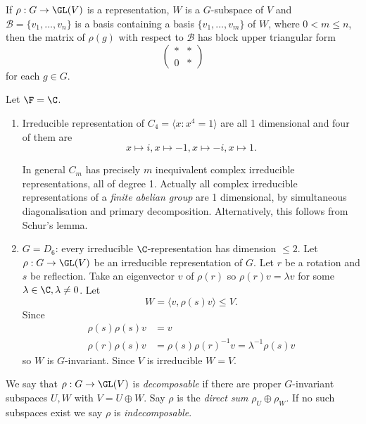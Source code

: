 \documentclass[a4paper]{article}
\theoremstyle{definition}
\begin{document}
\begin{lemma}
  If \(\rho: G \to \GL(V)\) is a representation, \(W\) is a \(G\)-subspace of \(V\) and \(\mathcal B = \{v_1, \dots, v_n\}\) is a basis containing a basis \(\{v_1, \dots, v_m\}\) of \(W\), where \(0 < m \leq n\), then the matrix of \(\rho(g)\) with respect to \(\mathcal B\) has block upper triangular form
  \[
    \begin{pmatrix}
      * & * \\
      0 & *
    \end{pmatrix}
  \]
  for each \(g \in G\).
\end{lemma}

\begin{eg}
  Let \(\F = \C\).
  \begin{enumerate}
  \item Irreducible representation of \(C_4 = \langle x: x^4 = 1\rangle\) are all 1 dimensional and four of them are
    \[
      x \mapsto i, x \mapsto -1, x \mapsto -i, x \mapsto 1.
    \]

    In general \(C_m\) has precisely \(m\) inequivalent complex irreducible representations, all of degree 1. Actually all complex irreducible representations of a \emph{finite abelian group} are 1 dimensional, by simultaneous diagonalisation and primary decomposition. Alternatively, this follows from Schur's lemma.
  \item \(G = D_6\): every irreducible \(\C\)-representation has dimension \(\leq 2\). Let \(\rho: G \to \GL(V)\) be an irreducible representation of \(G\). Let \(r\) be a rotation and \(s\) be reflection. Take an eigenvector \(v\) of \(\rho(r)\) so \(\rho(r)v = \lambda v\) for some \(\lambda \in \C, \lambda \neq 0\). Let
    \[
      W = \langle v, \rho(s) v \rangle \leq V.
    \]
    Since
    \begin{align*}
      \rho(s)\rho(s) v &= v \\
      \rho(r)\rho(s) v &= \rho(s)\rho(r)^{-1}v = \lambda^{-1}\rho(s)v
    \end{align*}
    so \(W\) is \(G\)-invariant. Since \(V\) is irreducible \(W = V\).
  \end{enumerate}
\end{eg}

\begin{definition}
  We say that \(\rho: G \to \GL(V)\) is \emph{decomposable} if there are proper \(G\)-invariant subspaces \(U, W\) with \(V = U \oplus W\). Say \(\rho\) is the \emph{direct sum} \(\rho_U \oplus \rho_W\). If no such subspaces exist we say \(\rho\) is \emph{indecomposable}.
\end{definition}
\end{document}
